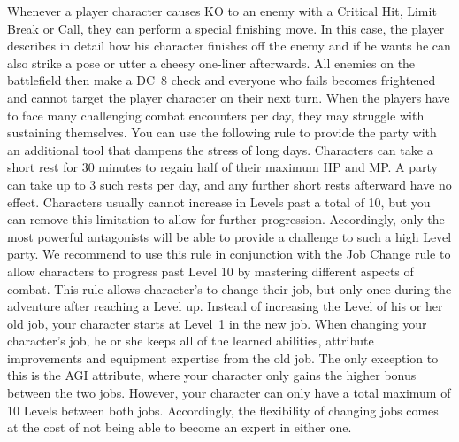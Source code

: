 Whenever a player character causes KO to an enemy with a Critical Hit, Limit Break or Call, they can perform a special finishing move.
In this case, the player describes in detail how his character finishes off the enemy and if he wants he can also strike a pose or utter a cheesy one-liner afterwards.
All enemies on the battlefield then make a DC~8 check and everyone who fails becomes frightened and cannot target the player character on their next turn.
%
\clearpage
%
%
\vfill
%
When the players have to face many challenging combat encounters per day, they may struggle with sustaining themselves.
You can use the following rule to provide the party with an additional tool that dampens the stress of long days.
Characters can take a short rest for 30 minutes to regain half of their maximum HP and MP. 
A party can take up to 3 such rests per day, and any further short rests afterward have no effect.
%
\vfill
%
Characters usually cannot increase in Levels past a total of 10, but you can remove this limitation to allow for further progression.
Accordingly, only the most powerful antagonists will be able to provide a challenge to such a high Level party.
We recommend to use this rule in conjunction with the Job Change rule to allow characters to progress past Level 10 by mastering different aspects of combat.
%
\vfill
%
This rule allows character's to change their job, but only once during the adventure after reaching a Level up.
Instead of increasing the Level of his or her old job, your character starts at Level~1 in the new job.
When changing your character's job, he or she keeps all of the learned abilities, attribute improvements and equipment expertise from the old job.  
The only exception to this is the AGI attribute, where your character only gains the higher bonus between the two jobs.
However, your character can only have a total maximum of 10 Levels between both jobs.
Accordingly, the flexibility of changing jobs comes at the cost of not being able to become an expert in either one.
%
\vfill
%
